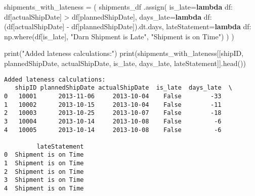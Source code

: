 \documentclass[
  letterpaper,
  DIV=11,
  numbers=noendperiod]{scrartcl}
\newenvironment{Shaded}{\begin{snugshade}}{\end{snugshade}}
\newcommand{\BuiltInTok}[1]{\textcolor[rgb]{0.00,0.23,0.31}{#1}}
\newcommand{\KeywordTok}[1]{\textcolor[rgb]{0.00,0.23,0.31}{\textbf{#1}}}
\newcommand{\NormalTok}[1]{\textcolor[rgb]{0.00,0.23,0.31}{#1}}
\newcommand{\OperatorTok}[1]{\textcolor[rgb]{0.37,0.37,0.37}{#1}}
\newcommand{\StringTok}[1]{\textcolor[rgb]{0.13,0.47,0.30}{#1}}
\begin{document}
\begin{Shaded}
\begin{Highlighting}[]
\NormalTok{shipments\_with\_lateness }\OperatorTok{=}\NormalTok{ (}
\NormalTok{    shipments\_df}
\NormalTok{    .assign(}
\NormalTok{        is\_late}\OperatorTok{=}\KeywordTok{lambda}\NormalTok{ df: df[}\StringTok{\textquotesingle{}actualShipDate\textquotesingle{}}\NormalTok{] }\OperatorTok{\textgreater{}}\NormalTok{ df[}\StringTok{\textquotesingle{}plannedShipDate\textquotesingle{}}\NormalTok{],}
\NormalTok{        days\_late}\OperatorTok{=}\KeywordTok{lambda}\NormalTok{ df: (df[}\StringTok{\textquotesingle{}actualShipDate\textquotesingle{}}\NormalTok{] }\OperatorTok{{-}}\NormalTok{ df[}\StringTok{\textquotesingle{}plannedShipDate\textquotesingle{}}\NormalTok{]).dt.days,}
\NormalTok{        lateStatement}\OperatorTok{=}\KeywordTok{lambda}\NormalTok{ df: np.where(df[}\StringTok{\textquotesingle{}is\_late\textquotesingle{}}\NormalTok{], }\StringTok{"Darn Shipment is Late"}\NormalTok{, }\StringTok{"Shipment is on Time"}\NormalTok{)}
\NormalTok{    )}
\NormalTok{)}

\BuiltInTok{print}\NormalTok{(}\StringTok{"Added lateness calculations:"}\NormalTok{)}
\BuiltInTok{print}\NormalTok{(shipments\_with\_lateness[[}\StringTok{\textquotesingle{}shipID\textquotesingle{}}\NormalTok{, }\StringTok{\textquotesingle{}plannedShipDate\textquotesingle{}}\NormalTok{, }\StringTok{\textquotesingle{}actualShipDate\textquotesingle{}}\NormalTok{, }\StringTok{\textquotesingle{}is\_late\textquotesingle{}}\NormalTok{, }\StringTok{\textquotesingle{}days\_late\textquotesingle{}}\NormalTok{, }\StringTok{\textquotesingle{}lateStatement\textquotesingle{}}\NormalTok{]].head())}
\end{Highlighting}
\end{Shaded}

\begin{verbatim}
Added lateness calculations:
   shipID plannedShipDate actualShipDate  is_late  days_late  \
0   10001      2013-11-06     2013-10-04    False        -33   
1   10002      2013-10-15     2013-10-04    False        -11   
2   10003      2013-10-25     2013-10-07    False        -18   
3   10004      2013-10-14     2013-10-08    False         -6   
4   10005      2013-10-14     2013-10-08    False         -6   

         lateStatement  
0  Shipment is on Time  
1  Shipment is on Time  
2  Shipment is on Time  
3  Shipment is on Time  
4  Shipment is on Time  
\end{verbatim}
\end{document}
